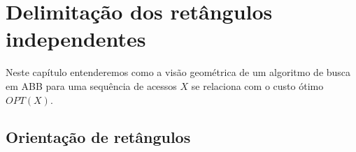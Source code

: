 
\chapter{Delimitação dos retângulos independentes}
\label{cap:algoritmo-guloso}

\newcommand{\retangulopos}{%
    \begin{tikzpicture}[baseline={(0,0)}, scale=0.2]
        \draw (0,0) rectangle (1.2,1.2); %
        \draw[thick] (0,0) -- (1.2,1.2); %
        \fill (0,0) circle (0.15); %
        \fill (1.2,1.2) circle (0.15); %
    \end{tikzpicture}%
}

\newcommand{\retanguloneg}{%
    \begin{tikzpicture}[baseline={(0,0)}, scale=0.2]
        \draw (0,0) rectangle (1.2,1.2); %
        \draw[thick] (0,1.2) -- (1.2,0); %
        \fill (0,1.2) circle (0.15); %
        \fill (1.2,0) circle (0.15); %
    \end{tikzpicture}%
}

\newcommand{\retangulototal}{%
    \begin{tikzpicture}[baseline={(0,0)}, scale=0.2]
        \draw (0,0) rectangle (1.2,1.2); %
        \draw[thick] (0,1.2) -- (1.2,0); %
        \draw[thick] (0,0) -- (1.2,1.2); %
        \fill (0,1.2) circle (0.15); %
        \fill (1.2,0) circle (0.15); %
        \fill (0,0) circle (0.15); %
        \fill (1.2,1.2) circle (0.15); %
    \end{tikzpicture}%
}

Neste capítulo entenderemos como a visão geométrica de um algoritmo de busca em ABB para uma sequência de acessos $X$ se relaciona com o custo ótimo $OPT(X)$.

\section{Orientação de retângulos}

